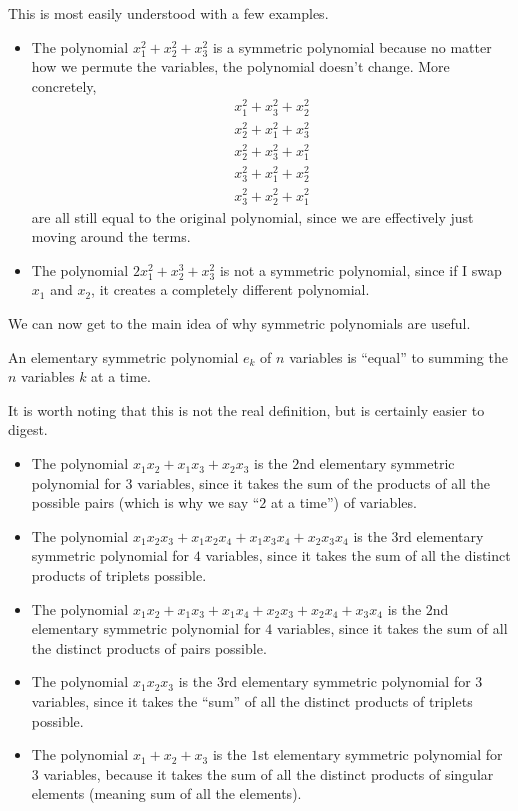 \documentclass[11pt]{scrartcl}
\begin{document}
This is most easily understood with a few examples.

\begin{example*}
\begin{itemize}
\item The polynomial $x_1^2+x_2^2+x_3^2$ is a symmetric polynomial because no matter how we permute the variables, the polynomial doesn't change. More concretely,
\begin{align*}
x_1^2+x_3^2+x_2^2 \\
x_2^2+x_1^2+x_3^2 \\
x_2^2+x_3^2+x_1^2 \\
x_3^2+x_1^2+x_2^2 \\
x_3^2+x_2^2+x_1^2
\end{align*}
are all still equal to the original polynomial, since we are effectively just moving around the terms.
\item The polynomial $2x_1^2+x_2^3+x_3^2$ is not a symmetric polynomial, since if I swap $x_1$ and $x_2$, it creates a completely different polynomial.
\end{itemize}
\end{example*}

We can now get to the main idea of why symmetric polynomials are useful.

\begin{definition*}
An elementary symmetric polynomial $e_k$ of $n$ variables is ``equal'' to summing the $n$ variables $k$ at a time.
\end{definition*}

It is worth noting that this is not the real definition, but is certainly easier to digest.

\begin{example*}
\begin{itemize}
\item The polynomial $x_1x_2+x_1x_3+x_2x_3$ is the $2$nd elementary symmetric polynomial for $3$ variables, since it takes the sum of the products of all the possible pairs (which is why we say ``$2$ at a time'') of variables.
\item The polynomial $x_1x_2x_3+x_1x_2x_4+x_1x_3x_4+x_2x_3x_4$ is the $3$rd elementary symmetric polynomial for $4$ variables, since it takes the sum of all the distinct products of triplets possible.
\item The polynomial $x_1x_2+x_1x_3+x_1x_4+x_2x_3+x_2x_4+x_3x_4$ is the $2$nd elementary symmetric polynomial for $4$ variables, since it takes the sum of all the distinct products of pairs possible.
\item The polynomial $x_1x_2x_3$ is the $3$rd elementary symmetric polynomial for $3$ variables, since it takes the ``sum'' of all the distinct products of triplets possible.
\item The polynomial $x_1+x_2+x_3$ is the $1$st elementary symmetric polynomial for $3$ variables, because it takes the sum of all the distinct products of singular elements (meaning sum of all the elements).
\end{itemize}
\end{example*}
\end{document}
